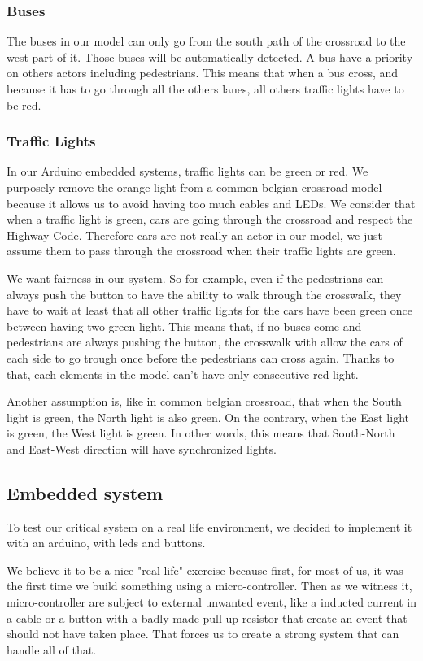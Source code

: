 \subsubsection{Buses}
The buses in our model can only go from the south path of the crossroad to the west part of it. Those buses will be automatically detected. A bus have a priority on others actors including pedestrians. This means that when a bus cross, and because it has to go through all the others lanes, all others traffic lights have to be red.

\subsubsection{Traffic Lights}
In our Arduino embedded systems, traffic lights can be green or red. We purposely remove the orange light from a common belgian crossroad model because it allows us to avoid having too much cables and LEDs. We consider that when a traffic light is green, cars are going through the crossroad and respect the Highway Code. Therefore cars are not really an actor in our model, we just assume them to pass through the crossroad when their traffic lights are green. 

We want fairness in our system. So for example, even if the pedestrians can always push the button to have the ability to walk through the crosswalk, they have to wait at least that all other traffic lights for the cars have been green once between having two green light. This means that, if no buses come and pedestrians are always pushing the button, the crosswalk with allow the cars of each side to go trough once before the pedestrians can cross again. Thanks to that, each elements in the model can't have only consecutive red light.

Another assumption is, like in common belgian crossroad, that when the South light is green, the North light is also green. On the contrary, when the East light is green, the West light is green. In other words, this means that South-North and East-West direction will have synchronized lights.


\subsection{Embedded system}

To test our critical system on a real life environment, we decided to implement it with an arduino, with leds and buttons.

We believe it to be a nice "real-life" exercise because first, for most of us, it was the first time we build something using a micro-controller. Then as we witness it, micro-controller are subject to external unwanted event, like a inducted current in a cable or a button with a badly made pull-up resistor that create an event that should not have taken place. That forces us to create a strong system that can handle all of that.


